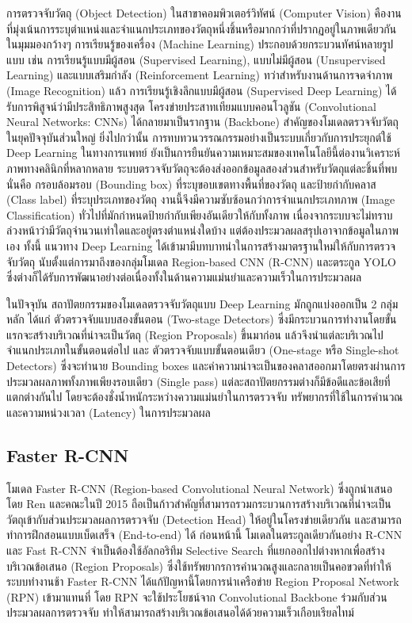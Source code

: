 การตรวจจับวัตถุ (Object Detection) ในสาขาคอมพิวเตอร์วิทัศน์ (Computer Vision) คืองานที่มุ่งเน้นการระบุตำแหน่งและจำแนกประเภทของวัตถุหนึ่งชิ้นหรือมากกว่าที่ปรากฏอยู่ในภาพเดียวกัน ในมุมมองกว้างๆ การเรียนรู้ของเครื่อง (Machine Learning) ประกอบด้วยกระบวนทัศน์หลายรูปแบบ เช่น การเรียนรู้แบบมีผู้สอน (Supervised Learning), แบบไม่มีผู้สอน (Unsupervised Learning) และแบบเสริมกำลัง (Reinforcement Learning) \cite{alam2023ml,murphy2025rl} ทว่าสำหรับงานด้านการจดจำภาพ (Image Recognition) แล้ว การเรียนรู้เชิงลึกแบบมีผู้สอน (Supervised Deep Learning) ได้รับการพิสูจน์ว่ามีประสิทธิภาพสูงสุด โครงข่ายประสาทเทียมแบบคอนโวลูชัน (Convolutional Neural Networks: CNNs) ได้กลายมาเป็นรากฐาน (Backbone) สำคัญของโมเดลตรวจจับวัตถุในยุคปัจจุบันส่วนใหญ่ \cite{purwono2023cnn} ยิ่งไปกว่านั้น การทบทวนวรรณกรรมอย่างเป็นระบบเกี่ยวกับการประยุกต์ใช้ Deep Learning ในทางการแพทย์ ยังเป็นการยืนยันความเหมาะสมของเทคโนโลยีนี้ต่องานวิเคราะห์ภาพทางคลินิกที่หลากหลาย \cite{egger2022} ระบบตรวจจับวัตถุจะต้องส่งออกข้อมูลสองส่วนสำหรับวัตถุแต่ละชิ้นที่พบ นั่นคือ กรอบล้อมรอบ (Bounding box) ที่ระบุขอบเขตทางพื้นที่ของวัตถุ และป้ายกำกับคลาส (Class label) ที่ระบุประเภทของวัตถุ งานนี้จึงมีความซับซ้อนกว่าการจำแนกประเภทภาพ (Image Classification) ทั่วไปที่มักกำหนดป้ายกำกับเพียงอันเดียวให้กับทั้งภาพ เนื่องจากระบบจะไม่ทราบล่วงหน้าว่ามีวัตถุจำนวนเท่าใดและอยู่ตรงตำแหน่งใดบ้าง แต่ต้องประมวลผลสรุปเอาจากข้อมูลในภาพเอง ทั้งนี้ แนวทาง Deep Learning ได้เข้ามามีบทบาทนำในการสร้างมาตรฐานใหม่ให้กับการตรวจจับวัตถุ นับตั้งแต่การมาถึงของกลุ่มโมเดล Region-based CNN (R-CNN) และตระกูล YOLO ซึ่งต่างก็ได้รับการพัฒนาอย่างต่อเนื่องทั้งในด้านความแม่นยำและความเร็วในการประมวลผล

ในปัจจุบัน สถาปัตยกรรมของโมเดลตรวจจับวัตถุแบบ Deep Learning มักถูกแบ่งออกเป็น 2 กลุ่มหลัก ได้แก่ ตัวตรวจจับแบบสองขั้นตอน (Two-stage Detectors) ซึ่งมีกระบวนการทำงานโดยขั้นแรกจะสร้างบริเวณที่น่าจะเป็นวัตถุ (Region Proposals) ขึ้นมาก่อน แล้วจึงนำแต่ละบริเวณไปจำแนกประเภทในขั้นตอนต่อไป และ ตัวตรวจจับแบบขั้นตอนเดียว (One-stage หรือ Single-shot Detectors) ซึ่งจะทำนาย Bounding boxes และค่าความน่าจะเป็นของคลาสออกมาโดยตรงผ่านการประมวลผลภาพทั้งภาพเพียงรอบเดียว (Single pass) แต่ละสถาปัตยกรรมต่างก็มีข้อดีและข้อเสียที่แตกต่างกันไป โดยจะต้องชั่งน้ำหนักระหว่างความแม่นยำในการตรวจจับ ทรัพยากรที่ใช้ในการคำนวณ และความหน่วงเวลา (Latency) ในการประมวลผล

\subsection{Faster R-CNN}

โมเดล Faster R-CNN (Region-based Convolutional Neural Network) ซึ่งถูกนำเสนอโดย Ren และคณะในปี 2015 ถือเป็นก้าวสำคัญที่สามารถรวมกระบวนการสร้างบริเวณที่น่าจะเป็นวัตถุเข้ากับส่วนประมวลผลการตรวจจับ (Detection Head) ให้อยู่ในโครงข่ายเดียวกัน และสามารถทำการฝึกสอนแบบเบ็ดเสร็จ (End-to-end) ได้ \cite{ren2015faster} ก่อนหน้านี้ โมเดลในตระกูลเดียวกันอย่าง R-CNN และ Fast R-CNN จำเป็นต้องใช้อัลกอริทึม Selective Search ที่แยกออกไปต่างหากเพื่อสร้างบริเวณข้อเสนอ (Region Proposals) ซึ่งใช้ทรัพยากรการคำนวณสูงและกลายเป็นคอขวดที่ทำให้ระบบทำงานช้า Faster R-CNN ได้แก้ปัญหานี้โดยการนำเครือข่าย Region Proposal Network (RPN) เข้ามาแทนที่ โดย RPN จะใช้ประโยชน์จาก Convolutional Backbone ร่วมกับส่วนประมวลผลการตรวจจับ ทำให้สามารถสร้างบริเวณข้อเสนอได้ด้วยความเร็วเกือบเรียลไทม์

